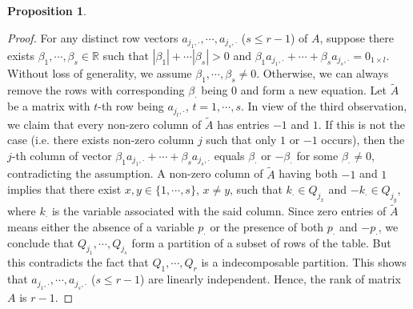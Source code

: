 \documentclass[11pt]{article}
\numberwithin{equation}{section}
\theoremstyle{plain}
\theoremstyle{definition}
\theoremstyle{definition}
\theoremstyle{assumption}
\theoremstyle{proposition}
\newtheorem{proposition}{Proposition}[section]
\theoremstyle{proposition}
\theoremstyle{example}
\theoremstyle{lemma}
\theoremstyle{theorem}
\theoremstyle{remark}
\begin{document}
\begin{proposition}
\begin{proof}
For any distinct row vectors $a_{j_1,\cdot},\cdots,a_{j_s,\cdot}$ ($s\leqslant r-1$) of $A$, suppose there exists $\beta_1,\cdots,\beta_s\in\mathbb{R}$ such that $|\beta_1|+\cdots|\beta_s|>0$ and $\beta_{1}a_{j_1,\cdot}+\cdots+\beta_{s}a_{j_s,\cdot}=0_{1\times l}$. Without loss of generality, we assume $\beta_1,\cdots,\beta_s\neq0$. Otherwise, we can always remove the rows with corresponding $\beta_{\cdot}$ being 0 and form a new equation. Let $\tilde{A}$ be a matrix with $t$-th row being $a_{j_t,\cdot}$, $t=1,\cdots,s$. In view of the third observation, we claim that every non-zero column of $\tilde{A}$ has entries $-1$ and $1$. If this is not the case (i.e. there exists non-zero column $j$ such that only $1$ or $-1$ occurs), then the $j$-th column of vector $\beta_{1}a_{j_1,\cdot}+\cdots+\beta_{s}a_{j_s,\cdot}$ equals $\beta_{\cdot}$ or $-\beta_{\cdot}$ for some $\beta_{\cdot}\neq0$, contradicting the assumption. A non-zero column of $\tilde{A}$ having both $-1$ and $1$ implies that there exist $x,y\in\{1,\cdots,s\}$, $x\neq y$, such that  $k_{\cdot}\in Q_{j_x}$ and $-k_{\cdot}\in Q_{j_y}$, where $k_{\cdot}$ is the variable associated with the said column. Since zero entries of $\tilde{A}$ means either the absence of a variable $p_{\cdot}$ or the presence of both $p_{\cdot}$ and $-p_{\cdot}$, we conclude that 
$Q_{j_1},\cdots,Q_{j_s}$ form a partition of a subset of rows of the table. But this contradicts the fact that $Q_1,\cdots,Q_r$ is a indecomposable partition. This shows that $a_{j_1,\cdot},\cdots,a_{j_s,\cdot}$ ($s\leqslant r-1$) are linearly independent. Hence, the rank of matrix $A$ is $r-1$.

\end{proof}
\end{proposition}
\fi





%
\end{document}
